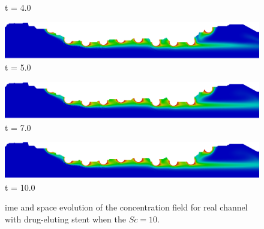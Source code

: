 \begin{figure}[H]
\begin{minipage}{.50\linewidth}
      t = 4.0
     \end{minipage}%
     \begin{minipage}{.50\linewidth}
      \centering
      \includegraphics[scale=0.115]{./02_chaps/cap_solution/figure/conc10_RealStrut25000.png}\\
      t = 5.0
     \end{minipage}
     \begin{minipage}{.50\linewidth}
     \medskip
      \centering
      \includegraphics[scale=0.115]{./02_chaps/cap_solution/figure/conc10_RealStrut35000.png}\\
      t = 7.0
     \end{minipage}%
     \begin{minipage}{.50\linewidth}
     \medskip
      \centering
      \includegraphics[scale=0.115]{./02_chaps/cap_solution/figure/conc10_RealStrut50000.png}\\
      t = 10.0
     \end{minipage}
     \medskip
     \caption{
ime and space evolution of the concentration field for real channel 
with drug-eluting stent when the $Sc=10$.}
     \label{conc field real stent sc 10}
\end{figure}


\newpage


